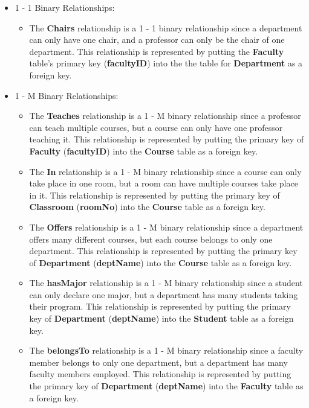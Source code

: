 \documentclass{report}
\begin{document}
\begin{itemize}
    \item 1 - 1 Binary Relationships:
    \begin{itemize}
        \item The \textbf{Chairs} relationship is a 1 - 1 binary relationship since a department can only have one chair, and a professor can only be the chair of one department. This relationship is represented by putting the \textbf{Faculty} table's primary key (\textbf{facultyID}) into the the table for \textbf{Department} as a foreign key.
    \end{itemize}

    \item 1 - M Binary Relationships:
    \begin{itemize}
        \item The \textbf{Teaches} relationship is a 1 - M binary relationship since a professor can teach multiple courses, but a course can only have one professor teaching it. This relationship is represented by putting the primary key of \textbf{Faculty} (\textbf{facultyID}) into the \textbf{Course} table as a foreign key.
        \item The \textbf{In} relationship is a 1 - M binary relationship since a course can only take place in one room, but a room can have multiple courses take place in it. This relationship is represented by putting the primary key of \textbf{Classroom} (\textbf{roomNo}) into the \textbf{Course} table as a foreign key.
        \item The \textbf{Offers} relationship is a 1 - M binary relationship since a department offers many different courses, but each course belongs to only one department. This relationship is represented by putting the primary key of \textbf{Department} (\textbf{deptName}) into the \textbf{Course} table as a foreign key.
        \item The \textbf{hasMajor} relationship is a 1 - M binary relationship since a student can only declare one major, but a department has many students taking their program. This relationship is represented by putting the primary key of \textbf{Department} (\textbf{deptName}) into the \textbf{Student} table as a foreign key.
        \item The \textbf{belongsTo} relationship is a 1 - M binary relationship since a faculty member belongs to only one department, but a department has many faculty members employed. This relationship is represented by putting the primary key of \textbf{Department} (\textbf{deptName}) into the \textbf{Faculty} table as a foreign key.

\end{itemize}
\end{itemize}
\end{document}
